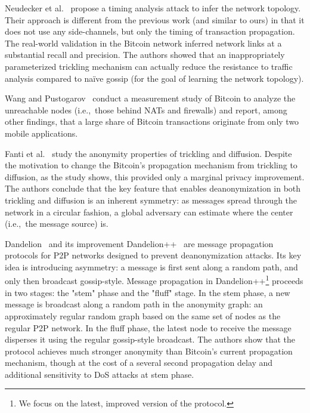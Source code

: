 Neudecker et al.~\cite{Neudecker2016} propose a timing analysis attack to infer the network topology.
Their approach is different from the previous work (and similar to ours) in that it does not use any side-channels, but only the timing of transaction propagation.
The real-world validation in the Bitcoin network inferred network links at a substantial recall and precision.
The authors showed that an inappropriately parameterized trickling mechanism can actually reduce the resistance to traffic analysis compared to na{\"i}ve gossip (for the goal of learning the network topology).

Wang and Pustogarov~\cite{Wang2017} conduct a measurement study of Bitcoin to analyze the unreachable nodes (i.e.,~those behind NATs and firewalls) and report, among other findings, that a large share of Bitcoin transactions originate from only two mobile applications.

Fanti et al.~\cite{Fanti2017} study the anonymity properties of trickling and diffusion.
Despite the motivation to change the Bitcoin's propagation mechanism from trickling to diffusion, as the study shows, this provided only a marginal privacy improvement.
The authors conclude that the key feature that enables deanonymization in both trickling and diffusion is an inherent symmetry: as messages spread through the network in a circular fashion, a global adversary can estimate where the center (i.e.,~the message source) is.

Dandelion~\cite{Venkatakrishnan2017} and its improvement Dandelion++~\cite{Fanti2018} are message propagation protocols for P2P networks designed to prevent deanonymization attacks.
Its key idea is introducing asymmetry: a message is first sent along a random path, and only then broadcast gossip-style.
Message propagation in Dandelion++\footnote{We focus on the latest, improved version of the protocol.} proceeds in two stages: the "stem" phase and the "fluff" stage.
In the stem phase, a new message is broadcast along a random path in the anonymity graph: an approximately regular random graph based on the same set of nodes as the regular P2P network.
In the fluff phase, the latest node to receive the message disperses it using the regular gossip-style broadcast.
The authors show that the protocol achieves much stronger anonymity than Bitcoin's current propagation mechanism, though at the cost of a several second propagation delay and additional sensitivity to DoS attacks at stem phase. 

